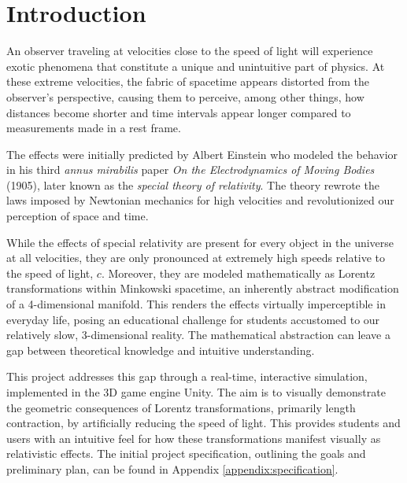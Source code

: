 \documentclass[a4paper]{article}
\begin{document}
\NoRule
\section{Introduction}
An observer traveling at velocities close to the speed of light will experience exotic phenomena that constitute a unique and unintuitive part of physics. At these extreme velocities, the fabric of spacetime appears distorted from the observer's perspective, causing them to perceive, among other things, how distances become shorter and time intervals appear longer compared to measurements made in a rest frame.

The effects were initially predicted by Albert Einstein who modeled the behavior in his third \textit{annus mirabilis}\cite{annus} paper \textit{On the Electrodynamics of Moving Bodies} (1905)\cite{einstein}, later known as the \textit{special theory of relativity}. The theory rewrote the laws imposed by Newtonian mechanics for high velocities and revolutionized our perception of space and time.

While the effects of special relativity are present for every object in the universe at all velocities, they are only pronounced at extremely high speeds relative to the speed of light, $c$. Moreover, they are modeled mathematically as Lorentz transformations within Minkowski spacetime, an inherently abstract modification of a 4-dimensional manifold. This renders the effects virtually imperceptible in everyday life, posing an educational challenge for students accustomed to our relatively slow, 3-dimensional reality. The mathematical abstraction can leave a gap between theoretical knowledge and intuitive understanding.

This project addresses this gap through a real-time, interactive simulation, implemented in the 3D game engine Unity. The aim is to visually demonstrate the geometric consequences of Lorentz transformations, primarily length contraction, by artificially reducing the speed of light. This provides students and users with an intuitive feel for how these transformations manifest visually as relativistic effects. The initial project specification, outlining the goals and preliminary plan, can be found in Appendix \ref{appendix:specification}.

\renewcommand{\SectionRule}{\titlerule[.5pt]}


\end{document}
